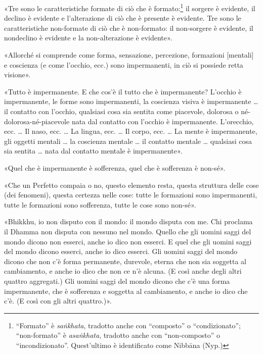  «Tre sono le caratteristiche formate di ciò che è
formato:\footnote{“Formato” è \emph{saṅkhata}, tradotto anche con “composto” o “condizionato”; “non-formato” è \emph{asaṅkhata}, tradotto anche con “non-composto” o “incondizionato”. Quest’ultimo è identificato come Nibbāna (Nyp.)}
il sorgere è evidente, il declino è evidente
e l’alterazione di ciò che è presente è evidente. Tre sono le
caratteristiche non-formate di ciò che è non-formato: il non-sorgere è
evidente, il nondeclino è evidente e la non-alterazione è evidente».




«Allorché si comprende come forma, sensazione, percezione, formazioni
[mentali] e coscienza (e come l’occhio, ecc.) sono impermanenti, in ciò
si possiede retta visione».




«Tutto è impermanente. E che cos’è il tutto che è impermanente? L’occhio
è impermanente, le forme sono impermanenti, la coscienza visiva è
impermanente … il contatto con l’occhio, qualsiasi cosa sia sentita come
piacevole, dolorosa o né-dolorosa-né-piacevole nata dal contatto con
l’occhio è impermanente. L’orecchio, ecc. … Il naso, ecc. … La lingua,
ecc. … Il corpo, ecc. … La mente è impermanente, gli oggetti mentali …
la coscienza mentale … il contatto mentale … qualsiasi cosa sia sentita
… nata dal contatto mentale è impermanente».




«Quel che è impermanente è sofferenza, quel che è sofferenza è non-sé».




«Che un Perfetto compaia o no, questo elemento resta, questa struttura
delle cose (dei fenomeni), questa certezza nelle cose: tutte le
formazioni sono impermanenti, tutte le formazioni sono sofferenza, tutte
le cose sono non-sé».




«Bhikkhu, io non disputo con il mondo: il mondo disputa con me. Chi
proclama il Dhamma non disputa con nessuno nel mondo. Quello che gli
uomini saggi del mondo dicono non esserci, anche io dico non esserci. E
quel che gli uomini saggi del mondo dicono esserci, anche io dico
esserci. Gli uomini saggi del mondo dicono che non c’è forma permanente,
durevole, eterna che non sia soggetta al cambiamento, e anche io dico
che non ce n’è alcuna. (E così anche degli altri quattro aggregati.) Gli
uomini saggi del mondo dicono che c’è una forma impermanente, che è
sofferenza e soggetta al cambiamento, e anche io dico che c’è. (E così
con gli altri quattro.)».


